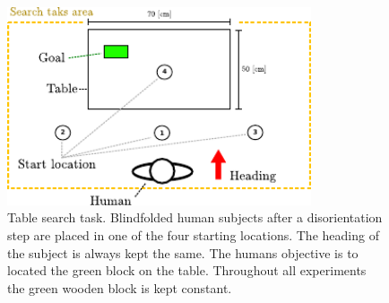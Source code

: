 \begin{figure}
 \centering
   \includegraphics[width=0.8\textwidth]{./ch3-Search/Figures/experimentsetup}
  \caption{Table search task. Blindfolded human subjects after a disorientation step are placed in one of the 
  four starting locations. The heading of the subject is always kept the same. The humans objective is to located 
  the green block on the table. Throughout all experiments the green wooden block is kept constant.}
  \label{fig:tab_search_task}
\end{figure}


